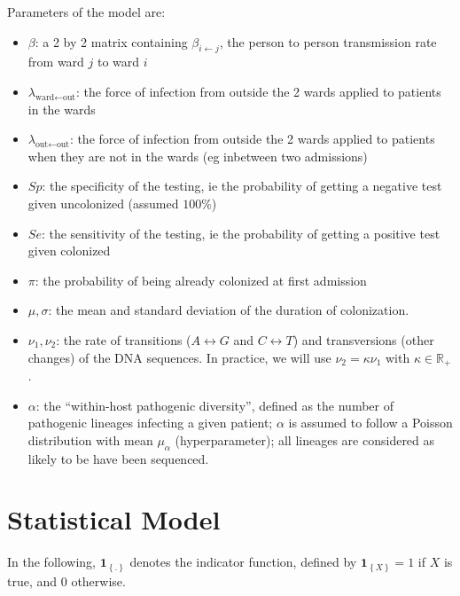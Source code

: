 \documentclass[10pt]{article}
\begin{document}
Parameters of the model are: 
\begin{itemize}
	\item $\beta$: a 2 by 2 matrix containing $\beta_{i \leftarrow j}$, the person to person transmission rate from ward $j$ to ward $i$
	\item $\lambda_{\text{ward} \leftarrow \text{out}}$: the force of infection from outside the 2 wards applied to patients in the wards
	\item $\lambda_{\text{out} \leftarrow \text{out}}$: the force of infection from outside the 2 wards applied to patients when they are not in the wards (eg inbetween two admissions)
	\item $Sp$: the specificity of the testing, ie the probability of getting a negative test given uncolonized (assumed $100\%$)
	\item $Se$: the sensitivity of the testing, ie the probability of getting a positive test given colonized
	\item $\pi$: the probability of being already colonized at first admission
	\item $\mu,\sigma$: the mean and standard deviation of the duration of colonization.
	\item $\nu_1,\nu_2$: the rate of transitions ($A \leftrightarrow G$ and $C \leftrightarrow T$) and transversions (other changes) of the DNA sequences. In practice, we will use $\nu_2=\kappa\nu_1$ with $\kappa \in \mathbb{R}_+$.
	\item $\alpha$: the ``within-host pathogenic diversity'', defined as the number of pathogenic lineages infecting a given patient; $\alpha$ is assumed to follow a Poisson distribution with mean $\mu_{\alpha}$ (hyperparameter); all lineages are considered as likely to be have been sequenced.
\end{itemize}

\section*{Statistical Model}

In the following, $\mathbf{1}_{\left\lbrace.\right\rbrace}$ denotes the indicator function, defined by $\mathbf{1}_{\left\lbrace X \right\rbrace}=1$ if $X$ is true, and $0$ otherwise.
\end{document}
